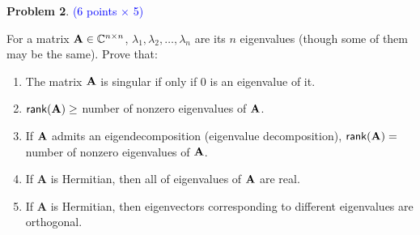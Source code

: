 \documentclass[english,onecolumn]{IEEEtran}
\newcommand{\bA}{{\bf A}}
\def\A{\mathbf{A}}
\begin{document}


\newpage
\noindent\textbf{Problem 2}. \textcolor{blue}{(6 points $\times$ 5)}

\noindent
For a matrix ${\bf A}\in {}^{n\times n}$, 
$\lambda_1, \lambda_2, \ldots, \lambda_n$   are its $n$ eigenvalues 
(though some of them may be the same). 
Prove that:
\begin{enumerate}
    \item The matrix ${\bf A}$ is singular if only if 0 is an eigenvalue of it.
    \item ${\sf rank}({\bf A}) \geq$ number of nonzero eigenvalues of ${\bf A}$.
    \item If ${\bf A}$ admits an  eigendecomposition (eigenvalue decomposition), ${\sf rank}({\bf A}) =$ number of nonzero eigenvalues of ${\bf A}$.
    \item If $\A$ is Hermitian, then all of eigenvalues of $\bA$ are real.
    \item If $\A$ is Hermitian, then eigenvectors corresponding to different eigenvalues are orthogonal.
\end{enumerate}
\end{document}
